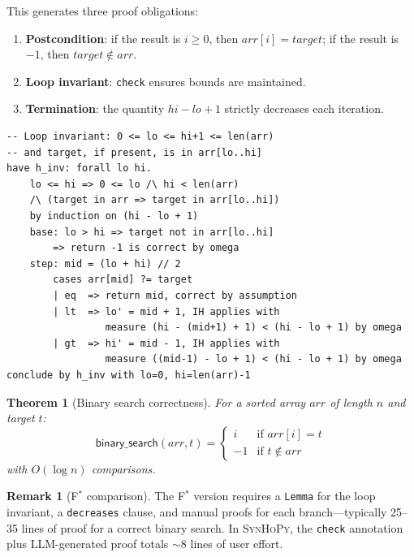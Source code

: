 \documentclass[11pt,a4paper]{report}
\theoremstyle{definition}
\newtheorem{remark}[definition]{Remark}
\theoremstyle{plain}
\newtheorem{theorem}[definition]{Theorem}
\newcommand{\fstar}{F$^{*}$}
\newcommand{\synhopy}{\textsc{SynHoPy}}
\begin{document}
This generates three proof obligations:
\begin{enumerate}
  \item \textbf{Postcondition}: if the result is $i \geq 0$, then $\mathit{arr}[i] = \mathit{target}$;
    if the result is $-1$, then $\mathit{target} \notin \mathit{arr}$.
  \item \textbf{Loop invariant}: \lstinline[style=synhopy]|check| ensures bounds are maintained.
  \item \textbf{Termination}: the quantity $\mathit{hi} - \mathit{lo} + 1$ strictly decreases each iteration.
\end{enumerate}

\begin{lstlisting}[style=proof]
-- Loop invariant: 0 <= lo <= hi+1 <= len(arr)
-- and target, if present, is in arr[lo..hi]
have h_inv: forall lo hi.
    lo <= hi => 0 <= lo /\ hi < len(arr)
    /\ (target in arr => target in arr[lo..hi])
    by induction on (hi - lo + 1)
    base: lo > hi => target not in arr[lo..hi]
        => return -1 is correct by omega
    step: mid = (lo + hi) // 2
        cases arr[mid] ?= target
        | eq  => return mid, correct by assumption
        | lt  => lo' = mid + 1, IH applies with
                 measure (hi - (mid+1) + 1) < (hi - lo + 1) by omega
        | gt  => hi' = mid - 1, IH applies with
                 measure ((mid-1) - lo + 1) < (hi - lo + 1) by omega
conclude by h_inv with lo=0, hi=len(arr)-1
\end{lstlisting}

\begin{theorem}[Binary search correctness]
\label{thm:bsearch}
For a sorted array $\mathit{arr}$ of length $n$ and target $t$:
\[
  \mathsf{binary\_search}(\mathit{arr}, t) =
  \begin{cases}
    i & \text{if } \mathit{arr}[i] = t \\
    -1 & \text{if } t \notin \mathit{arr}
  \end{cases}
\]
with $O(\log n)$ comparisons.
\end{theorem}

\begin{remark}[\fstar{} comparison]
The \fstar{} version requires a \lstinline[style=fstar]|Lemma| for the loop invariant,
a \lstinline[style=fstar]|decreases| clause, and manual proofs for each branch---typically
25--35 lines of proof for a correct binary search. In \synhopy{}, the \texttt{check}
annotation plus LLM-generated proof totals $\sim$8 lines of user effort.
\end{remark}
\end{document}
